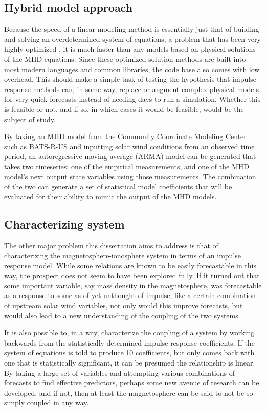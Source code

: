 \documentclass[10pt]{article}
\begin{document}
\subsection{Hybrid model approach}
Because the speed of a linear modeling method is essentially just that of building and solving an overdetermined system of equations, a problem that has been very highly optimized \citep{LP}, it is much faster than any models based on physical solutions of the MHD equations. Since these optimized solution methods are built into most modern languages and common libraries, the code base also comes with low overhead. This should make a simple task of testing the hypothesis that impulse response methods can, in some way, replace or augment complex physical models for very quick forecasts instead of needing days to run a simulation. Whether this is feasible or not, and if so, in which cases it would be feasible, would be the subject of study.

By taking an MHD model from the Community Coordinate Modeling Center \citep{CCMC} such as BATS-R-US and inputting solar wind conditions from an observed time period, an autoregressive moving average (ARMA) model can be generated that takes two timeseries: one of the empirical measurements, and one of the MHD model's next output state variables using those measurements. The combination of the two can generate a set of statistical model coefficients that will be evaluated for their ability to mimic the output of the MHD models.

\subsection{Characterizing system}
The other major problem this dissertation aims to address is that of characterizing the magnetosphere-ionosphere system in terms of an impulse response model. While some relations are known to be easily forecastable in this way, the prospect does not seem to have been explored fully. If it turned out that some important variable, say mass density in the magnetosphere, was forecastable as a response to some as-of-yet unthought-of impulse, like a certain combination of upstream solar wind variables, not only would this improve forecasts, but would also lead to a new understanding of the coupling of the two systems.

It is also possible to, in a way, characterize the coupling of a system by working backwards from the statistically determined impulse response coefficients. If the system of equations is told to produce 10 coefficients, but only comes back with one that is statistically significant, it can be presumed the relationship is linear. By taking a large set of variables \citep{Denton} and attempting various combinations of forecasts to find effective predictors, perhaps some new avenue of research can be developed, and if not, then at least the magnetosphere can be said to not be so simply coupled in any way. 
\end{document}
